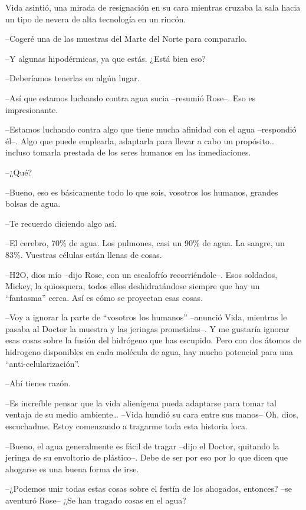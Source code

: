 {Vida asintió, una mirada de resignación en su cara mientras cruzaba la
sala hacia un tipo de nevera de alta tecnología en un rincón.}

{--Cogeré una de las muestras del Marte del Norte para compararlo.}

{--Y algunas hipodérmicas, ya que estás. ¿Está bien eso?}

{--Deberíamos tenerlas en algún lugar.}

{--Así que estamos luchando contra agua sucia --resumió Rose--. Eso es
impresionante.}

{--Estamos luchando contra algo que tiene mucha afinidad con el agua
 --respondió él--. Algo que puede emplearla, adaptarla para llevar a cabo
 un propósito\ldots{} incluso tomarla prestada de los seres humanos en
las inmediaciones.}

{--¿Qué?}

{--Bueno, eso es básicamente todo lo que sois, vosotros los humanos,
grandes bolsas de agua.}

{--Te recuerdo diciendo algo así.}

{--El cerebro, 70\% de agua. Los pulmones, casi un 90\% de agua. La
 sangre, un 83\%. Vuestras células están llenas de cosas.}

{--H2O, dios mío --dijo Rose, con un escalofrío recorriéndole--. Esos
 soldados, Mickey, la quiosquera, todos ellos deshidratándose siempre que
hay un ``fantasma'' cerca. Así es cómo se proyectan esas cosas.}

{--Voy a ignorar la parte de ``vosotros los humanos'' --anunció Vida,
 mientras le pasaba al Doctor la muestra y las jeringas prometidas--. Y
 me gustaría ignorar esas cosas sobre la fusión del hidrógeno que has
 escupido. Pero con dos átomos de hidrogeno disponibles en cada molécula
de agua, hay mucho potencial para una ``anti-celularización''.}

{--Ahí tienes razón.}

{--Es increíble pensar que la vida alienígena pueda adaptarse para tomar
 tal ventaja de su medio ambiente\ldots{} --Vida hundió su cara entre sus
 manos-- Oh, dios, escuchadme. Estoy comenzando a tragarme toda esta
historia loca.}

{--Bueno, el agua generalmente es fácil de tragar --dijo el Doctor,
 quitando la jeringa de su envoltorio de plástico--. Debe de ser por eso
por lo que dicen que ahogarse es una buena forma de irse.}

{--¿Podemos unir todas estas cosas sobre el festín de los ahogados,
entonces? --se aventuró Rose-- ¿Se han tragado cosas en el agua?}

